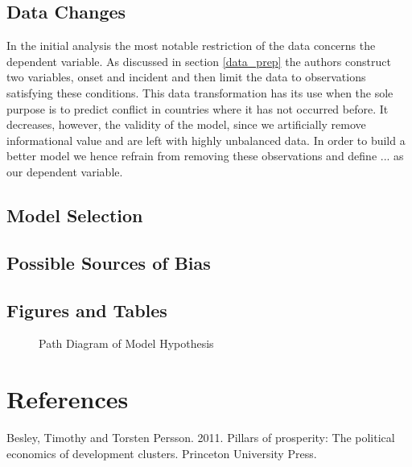 \subsection{Data Changes}
In the initial analysis the most notable restriction of the data concerns the dependent variable.
As discussed in section \ref{data_prep} the authors construct two variables, onset and incident and then limit the data to observations satisfying these conditions.
This data transformation has its use when the sole purpose is to predict conflict in countries where it has not occurred before.
It decreases, however, the validity of the model, since we artificially remove informational value and are left with highly unbalanced data.
In order to build a better model we hence refrain from removing these observations and define ... as our dependent variable.

\subsection{Model Selection}



\subsection{Possible Sources of Bias}


\newpage

\begin{appendix}
    \section{Figures and Tables}
     


    \begin{figure}[!htbp]
        \caption{Path Diagram of Model Hypothesis}
        \centering
        
        \label{path}
    \end{figure}
\end{appendix}

\newpage

\section*{References}
Besley, Timothy and Torsten Persson. 2011. Pillars of prosperity: The political economics \newline \indent of development clusters. Princeton University Press.\vspace{0.25cm}

